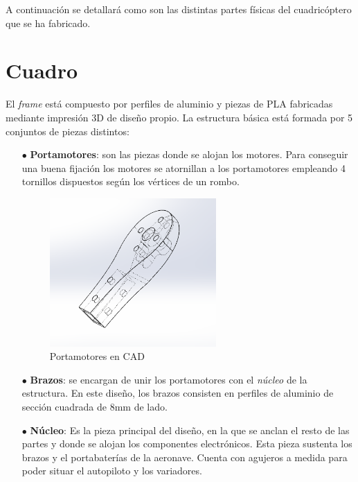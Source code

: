 A continuación se detallará como son las distintas partes físicas del cuadricóptero que se ha fabricado.



\section{Cuadro}
El \textit{frame} está compuesto por perfiles de aluminio y piezas de PLA fabricadas mediante impresión 3D de diseño propio. La estructura básica está formada por 5 conjuntos de piezas distintos:
\begin{itemize}
	\item[$\bullet$] \textbf{Portamotores}: son las piezas donde se alojan los motores. Para conseguir una buena fijación los motores se atornillan a los portamotores empleando 4 tornillos dispuestos según los vértices de un rombo.
	
	\begin{figure}[htb!]
		\centering
		\includegraphics[width=0.6\textwidth]{hardware/portamotores}
		\caption{Portamotores en CAD }
		\label{portam}
	\end{figure}
	
	
	\item [$\bullet$] \textbf{Brazos}: se encargan de unir los portamotores con el \textit{núcleo} de la estructura. En este diseño, los brazos consisten en perfiles de aluminio de sección cuadrada de 8mm de lado.
	
	\item [$\bullet$] \textbf{Núcleo}: Es la pieza principal del diseño, en la que se anclan el resto de las partes y donde se alojan los componentes electrónicos. Esta pieza sustenta los brazos y el portabaterías de la aeronave. Cuenta con agujeros a medida para poder situar el autopiloto y los variadores.
	

\end{itemize}
